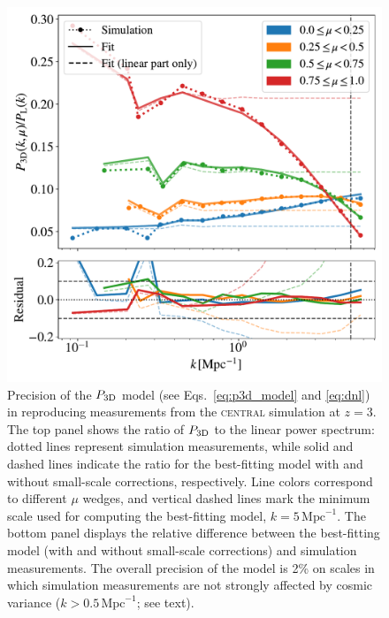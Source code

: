 \documentclass[fleqn,usenatbib]{mnras}
\newcommand{\pthreed}{\ensuremath{P_{\rm 3D}}\xspace}
\newcommand{\simcentral}{\textsc{central}\xspace}
\newcommand{\iMpc}{\ensuremath{\,\mathrm{Mpc}^{-1}}}
\begin{document}
\begin{figure}
\includegraphics[width=\columnwidth]{figures/motivate.pdf}
\centering
\caption{Precision of the \pthreed model (see Eqs.~\ref{eq:p3d_model} and \ref{eq:dnl}) in reproducing measurements from the \simcentral simulation at $z=3$. The top panel shows the ratio of \pthreed to the linear power spectrum: dotted lines represent simulation measurements, while solid and dashed lines indicate the ratio for the best-fitting model with and without small-scale corrections, respectively. Line colors correspond to different $\mu$ wedges, and vertical dashed lines mark the minimum scale used for computing the best-fitting model, $k=5\iMpc$. The bottom panel displays the relative difference between the best-fitting model (with and without small-scale corrections) and simulation measurements. The overall precision of the model is 2\% on scales in which simulation measurements are not strongly affected by cosmic variance ($k>0.5\iMpc$; see text).
}
\label{fig:arinyo}
\end{figure}
\end{document}
